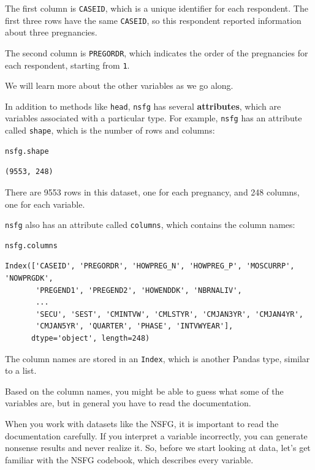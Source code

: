 The first column is \passthrough{\lstinline!CASEID!}, which is a unique
identifier for each respondent. The first three rows have the same
\passthrough{\lstinline!CASEID!}, so this respondent reported
information about three pregnancies.

The second column is \passthrough{\lstinline!PREGORDR!}, which indicates
the order of the pregnancies for each respondent, starting from
\passthrough{\lstinline!1!}.

We will learn more about the other variables as we go along.

In addition to methods like \passthrough{\lstinline!head!},
\passthrough{\lstinline!nsfg!} has several \textbf{attributes}, which
are variables associated with a particular type. For example,
\passthrough{\lstinline!nsfg!} has an attribute called
\passthrough{\lstinline!shape!}, which is the number of rows and
columns:

\begin{lstlisting}[language=Python]
nsfg.shape
\end{lstlisting}

\begin{lstlisting}[]
(9553, 248)
\end{lstlisting}

There are 9553 rows in this dataset, one for each pregnancy, and 248
columns, one for each variable.

\passthrough{\lstinline!nsfg!} also has an attribute called
\passthrough{\lstinline!columns!}, which contains the column names:

\begin{lstlisting}[language=Python]
nsfg.columns
\end{lstlisting}

\begin{lstlisting}[]
Index(['CASEID', 'PREGORDR', 'HOWPREG_N', 'HOWPREG_P', 'MOSCURRP', 'NOWPRGDK',
       'PREGEND1', 'PREGEND2', 'HOWENDDK', 'NBRNALIV',
       ...
       'SECU', 'SEST', 'CMINTVW', 'CMLSTYR', 'CMJAN3YR', 'CMJAN4YR',
       'CMJAN5YR', 'QUARTER', 'PHASE', 'INTVWYEAR'],
      dtype='object', length=248)
\end{lstlisting}

The column names are stored in an \passthrough{\lstinline!Index!}, which
is another Pandas type, similar to a list.

Based on the column names, you might be able to guess what some of the
variables are, but in general you have to read the documentation.

When you work with datasets like the NSFG, it is important to read the
documentation carefully. If you interpret a variable incorrectly, you
can generate nonsense results and never realize it. So, before we start
looking at data, let's get familiar with the NSFG codebook, which
describes every variable.

